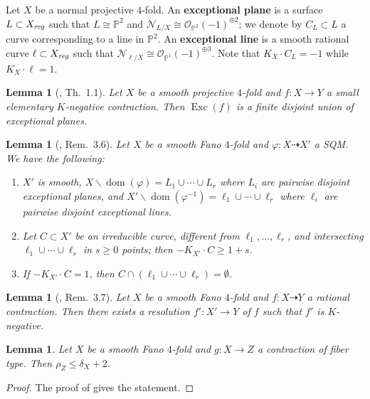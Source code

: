 \documentclass[a4paper,12pt]{amsart}
\newtheorem{lemma}[thm]{Lemma}
\theoremstyle{definition}
\numberwithin{figure}{section}
\numberwithin{table}{section}
\newcommand{\ph}{\varphi}
\newcommand{\w}{\widetilde}
\newcommand{\ma}{\mathcal}
\newcommand{\ol}{\mathcal{O}}
\newcommand{\wi}{\widehat}
\newcommand{\pr}{\mathbb{P}}
\newcommand{\dom}{\operatorname{dom}}
\newcommand{\Exc}{\operatorname{Exc}}
\newcommand{\reg}{\text{\it reg}}
\begin{document}
 Let $X$ be a normal projective $4$-fold. An {\bf exceptional plane} is a surface $L\subset X_{\reg}$ such that $L\cong\pr^2$ and $\ma{N}_{L/X}\cong\ol_{\pr^2}(-1)^{\oplus 2}$; we denote by $C_L\subset L$ a curve corresponding to a line in $\pr^2$. An {\bf exceptional line} is a smooth rational curve $\ell\subset X_{\reg}$ such that $\ma{N}_{\ell/X}\cong\ol_{\pr^1}(-1)^{\oplus 3}$. Note that $K_X\cdot C_L=-1$ while $K_X\cdot\ell=1$.
\begin{lemma}[\cite{kawsmall}, Th.~1.1]\label{kawamata}
Let $X$ be a smooth projective $4$-fold and $f\colon X\to Y$ a small elementary $K$-negative contraction. Then $\Exc(f)$ is a finite disjoint union of exceptional planes.
  \end{lemma}
  \begin{lemma}[\cite{eff}, Rem.~3.6]\label{SQMFano}
  Let  $X$ be a smooth Fano $4$-fold and $\ph\colon X\dasharrow X'$ a SQM.
  We have the following:
  \begin{enumerate}[$(a)$]
 \item $X'$ is smooth, $X\smallsetminus\dom(\ph)=L_1\cup\cdots\cup L_r$ where $L_i$ are pairwise disjoint exceptional planes,
and
$X'\smallsetminus\dom(\ph^{-1})=\ell_1\cup\cdots\cup\ell_r$
where $\ell_i$ are pairwise disjoint exceptional lines.
\item
  Let  $C\subset X'$ be an irreducible curve, different from $\ell_1,\dotsc,\ell_r$, and intersecting $\ell_1\cup\cdots\cup\ell_r$ in $s\geq 0$ points; then $-K_{X'}\cdot C\geq 1+s$.
  \item If $-K_{X'}\cdot C= 1$, then  $C\cap(\ell_1\cup\cdots\cup\ell_r)=\emptyset$.
\end{enumerate}  
\end{lemma}
\begin{lemma}[\cite{eff}, Rem.~3.7]\label{Kneg}
  Let  $X$ be a smooth Fano $4$-fold and $f\colon X\dasharrow Y$ a rational contraction. Then there exists a resolution  $f'\colon X'\to Y$
of $f$ such that $f'$ is $K$-negative.
\end{lemma}
\begin{lemma}\label{coop}
Let $X$ be a smooth Fano $4$-fold and $g\colon X\to Z$ a contraction of fiber type. Then $\rho_Z\leq \delta_X+2$.
\end{lemma}
\begin{proof}
The proof of \cite[Lemma 2.6]{32} gives the statement. 
\end{proof} 
\end{document}
